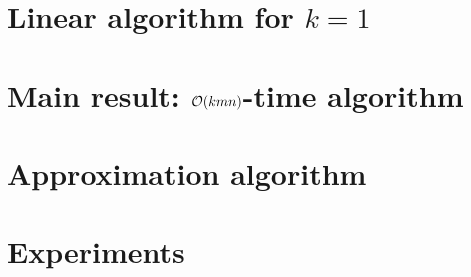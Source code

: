 \section{Linear algorithm for \texorpdfstring{$k=1$}{kone}}
\label{dtw:sec:lce}

\section{Main result: \texorpdfstring{$\mathcal{O}(kmn)$}{Okm}-time algorithm}
\label{dtw:sec:block}

\section{Approximation algorithm}
\label{dtw:sec:approx}

\section{Experiments}\label{dtw:sec:experiments}


\BiblatexSplitbibDefernumbersWarningOff

\backmatter
{}
\printbibliography[heading=subbibintoc]